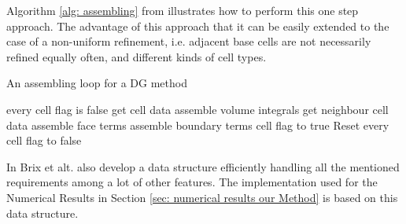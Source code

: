 Algorithm \ref{alg: assembling} from \cite{BMV2009} illustrates how to perform this one step approach. 
The advantage of this approach that it can be easily extended to the case of a non-uniform refinement, i.e. adjacent base cells are not necessarily refined equally often, and different kinds of cell types.

\begin{algorithm}[h]
\caption{An assembling loop for a DG method}
\label{alg: assembling}
\begin{algorithmic}
\Ensure every cell flag is false
\State get cell data
\State assemble volume integrals 
					\State get neighbour cell data
					\State assemble face terms
			\EndIf
		\Else
			\State assemble boundary terms
		\EndIf
\EndFor
	\State cell flag to true 
\EndFor
\State Reset every cell flag to false
\end{algorithmic}
\end{algorithm}

In \cite{BMV2009} Brix et alt. also develop a data structure efficiently handling all the mentioned requirements among a lot of other features. The implementation used for the Numerical Results in Section \ref{sec: numerical results our Method} is based on this data structure.